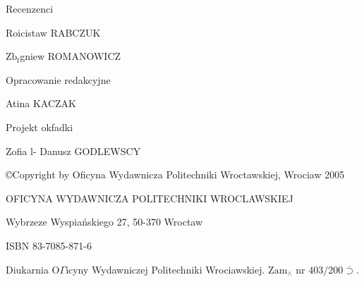 \documentclass[a4paper,12pt]{article}
\begin{document}
Recenzenci

Roicistaw RABCZUK

$\mathrm{Z}\mathrm{b}_{\mathrm{f}}$gniew ROMANOWICZ

Opracowanie redakcyjne

Atina KACZAK

Projekt okfadki

Zofia l- Danusz GODLEWSCY

\copyright Copyright by Oficyna Wydawnicza Politechniki Wroctawskiej, Wrociaw 2005

OFICYNA WYDAWNICZA POLITECHNIKI WROCLAWSKIEJ

Wybrzeze Wyspiańskiego 27, 50-370 Wroctaw

ISBN 83-7085-871-6

Diukarnia $\mathrm{O}\Gamma$icyny Wydawniczej Politechniki Wrociawskiej. $\mathrm{Z}\mathrm{a}\mathrm{m}_{\wedge}$ nr $403/200\overline{\supset}.$
\end{document}
